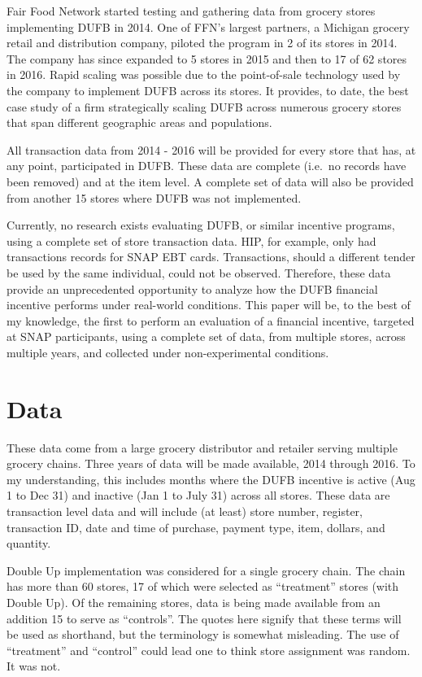 \documentclass[12pt,letterpaperpaper,]{book}
\begin{document}
Fair Food Network started testing and gathering data from grocery stores
implementing DUFB in 2014. One of FFN's largest partners, a Michigan
grocery retail and distribution company, piloted the program in 2 of its
stores in 2014. The company has since expanded to 5 stores in 2015 and
then to 17 of 62 stores in 2016. Rapid scaling was possible due to the
point-of-sale technology used by the company to implement DUFB across
its stores. It provides, to date, the best case study of a firm
strategically scaling DUFB across numerous grocery stores that span
different geographic areas and populations.

All transaction data from 2014 - 2016 will be provided for every store
that has, at any point, participated in DUFB. These data are complete
(i.e.~no records have been removed) and at the item level. A complete
set of data will also be provided from another 15 stores where DUFB was
not implemented.

Currently, no research exists evaluating DUFB, or similar incentive
programs, using a complete set of store transaction data. HIP, for
example, only had transactions records for SNAP EBT cards. Transactions,
should a different tender be used by the same individual, could not be
observed. Therefore, these data provide an unprecedented opportunity to
analyze how the DUFB financial incentive performs under real-world
conditions. This paper will be, to the best of my knowledge, the first
to perform an evaluation of a financial incentive, targeted at SNAP
participants, using a complete set of data, from multiple stores, across
multiple years, and collected under non-experimental conditions.

\section*{Data}\label{data-1}

These data come from a large grocery distributor and retailer serving
multiple grocery chains. Three years of data will be made available,
2014 through 2016. To my understanding, this includes months where the
DUFB incentive is active (Aug 1 to Dec 31) and inactive (Jan 1 to July
31) across all stores. These data are transaction level data and will
include (at least) store number, register, transaction ID, date and time
of purchase, payment type, item, dollars, and quantity.

Double Up implementation was considered for a single grocery chain. The
chain has more than 60 stores, 17 of which were selected as
``treatment'' stores (with Double Up). Of the remaining stores, data is
being made available from an addition 15 to serve as ``controls''. The
quotes here signify that these terms will be used as shorthand, but the
terminology is somewhat misleading. The use of ``treatment'' and
``control'' could lead one to think store assignment was random. It was
not.
\end{document}
